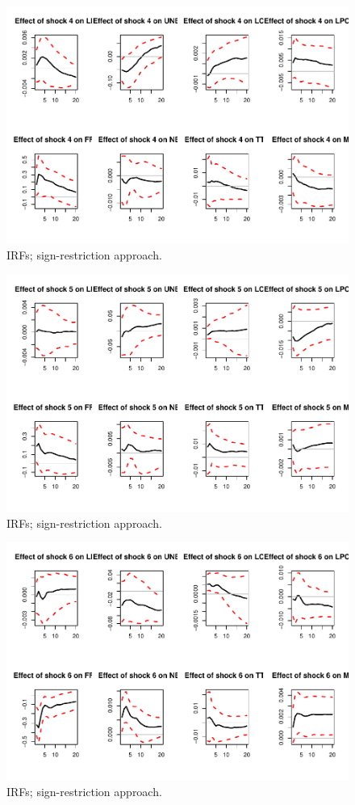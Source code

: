\documentclass[
  12pt,
]{book}
\theoremstyle{definition}
\theoremstyle{definition}
\theoremstyle{definition}
\theoremstyle{definition}
\theoremstyle{remark}
\begin{document}
\begin{figure}
\includegraphics[width=0.95\linewidth]{IdentifStructShocks_files/figure-latex/signrestr2-4} \caption{IRFs; sign-restriction approach.}\label{fig:signrestr2-4}
\end{figure}
\begin{figure}
\includegraphics[width=0.95\linewidth]{IdentifStructShocks_files/figure-latex/signrestr2-5} \caption{IRFs; sign-restriction approach.}\label{fig:signrestr2-5}
\end{figure}
\begin{figure}
\includegraphics[width=0.95\linewidth]{IdentifStructShocks_files/figure-latex/signrestr2-6} \caption{IRFs; sign-restriction approach.}\label{fig:signrestr2-6}
\end{figure}
\end{document}
